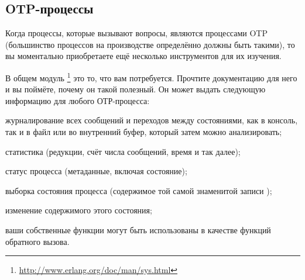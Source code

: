 \subsection{OTP-процессы}

Когда процессы, которые вызывают вопросы, являются процессами OTP (большинство процессов на производстве определённо должны быть такими), то вы моментально приобретаете ещё несколько инструментов для их изучения.

В общем модуль \footnote{\href{http://www.erlang.org/doc/man/sys.html}{http://www.erlang.org/doc/man/sys.html}} это то, что вам потребуется. Прочтите документацию для него и вы поймёте, почему он такой полезный. Он может выдать следующую информацию для любого ОТР-процесса:

\begin{itemize*}
	\item журналирование всех сообщений и переходов между состояниями, как в консоль, так и в файл или во внутренний буфер, который затем можно анализировать;
	\item статистика (редукции, счёт числа сообщений, время и так далее);
	\item статус процесса (метаданные, включая состояние);
	\item выборка состояния процесса (содержимое той самой знаменитой записи );
	\item изменение содержимого этого состояния;
	\item ваши собственные функции могут быть использованы в качестве функций обратного вызова.
\end{itemize*}

